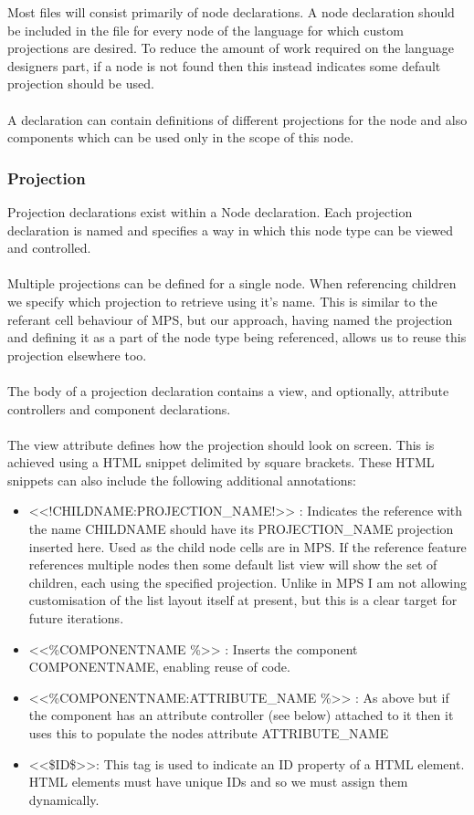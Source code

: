 \documentclass{article}
\begin{document}
{Most files will consist primarily of node declarations. A node declaration should be included in the file for every node of the language for which custom projections are desired. To reduce the amount of work required on the language designers part, if a node is not found then this instead indicates some default projection should be used.  
\\
\\
A declaration can contain definitions of different projections for the node and also components which can be used only in the scope of this node.

\subsubsection{Projection}
Projection declarations exist within a Node declaration. Each projection declaration is named and specifies a way in which this node type can be viewed and controlled.
\\
\\
Multiple projections can be defined for a single node. When referencing children we specify which projection to retrieve using it's name. This is similar to the referant cell behaviour of MPS, but our approach, having named the projection and defining it as a part of the node type being referenced, allows us to reuse this projection elsewhere too.
\\
\\
The body of a projection declaration contains a view, and optionally, attribute controllers and component declarations.
\\
\\
The view attribute defines how the projection should look on screen. This is achieved using a HTML snippet delimited by square brackets.  These HTML snippets can also include the following additional annotations:
\begin{itemize}
\item <<!CHILDNAME:PROJECTION\_NAME!>> : Indicates the reference with the name CHILDNAME should have its PROJECTION\_NAME projection inserted here. Used as the child node cells are in MPS. If the reference feature references multiple nodes then some default list view will show the set of children, each using the specified projection. Unlike in MPS I am not allowing customisation of the list layout itself at present, but this is a clear target for future iterations.
\item <<\%COMPONENTNAME \%>> : Inserts the component COMPONENTNAME, enabling reuse of code.
\item <<\%COMPONENTNAME:ATTRIBUTE\_NAME \%>> : As above but if the component has an attribute controller (see below) attached to it then it uses this to populate the nodes attribute ATTRIBUTE\_NAME
\item <<\$ID\$>>: This tag is used to indicate an ID property of a HTML element. HTML elements must have unique IDs and so we must assign them dynamically.
\end{itemize}

}
\end{document}
